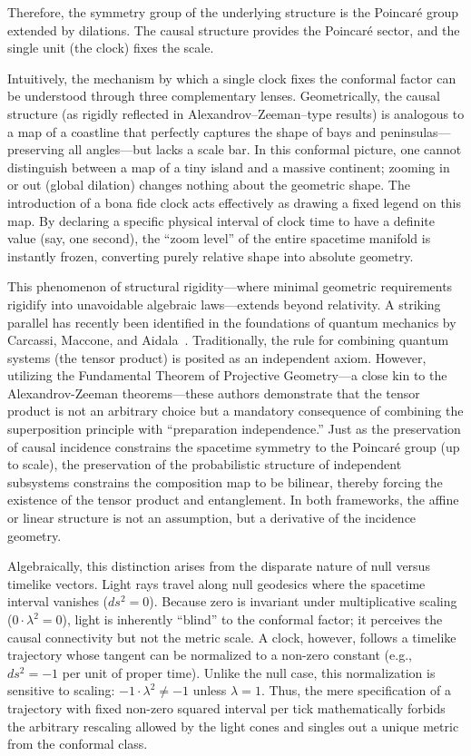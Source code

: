 \documentclass[aps,prd,twocolumn,nofootinbib,superscriptaddress]{revtex4-2}
\begin{document}
Therefore, the symmetry group of the underlying structure is the Poincar{\'e} group extended by dilations. The causal structure provides the Poincar{\'e} sector, and the single unit (the clock) fixes the scale.

Intuitively, the mechanism by which a single clock fixes the conformal factor can be understood through three complementary lenses. Geometrically, the causal structure (as rigidly reflected in Alexandrov--Zeeman--type results) is analogous to a map of a coastline that perfectly captures the shape of bays and peninsulas---preserving all angles---but lacks a scale bar. In this conformal picture, one cannot distinguish between a map of a tiny island and a massive continent; zooming in or out (global dilation) changes nothing about the geometric shape. The introduction of a bona fide clock acts effectively as drawing a fixed legend on this map. By declaring a specific physical interval of clock time to have a definite value (say, one second), the ``zoom level'' of the entire spacetime manifold is instantly frozen, converting purely relative shape into absolute geometry.

This phenomenon of structural rigidity---where minimal geometric requirements rigidify into unavoidable algebraic laws---extends beyond relativity. A striking parallel has recently been identified in the foundations of quantum mechanics by Carcassi, Maccone, and Aidala~\cite{carcassi2021}. Traditionally, the rule for combining quantum systems (the tensor product) is posited as an independent axiom. However, utilizing the Fundamental Theorem of Projective Geometry---a close kin to the Alexandrov-Zeeman theorems---these authors demonstrate that the tensor product is not an arbitrary choice but a mandatory consequence of combining the superposition principle with ``preparation independence.'' Just as the preservation of causal incidence constrains the spacetime symmetry to the Poincar\'{e} group (up to scale), the preservation of the probabilistic structure of independent subsystems constrains the composition map to be bilinear, thereby forcing the existence of the tensor product and entanglement. In both frameworks, the affine or linear structure is not an assumption, but a derivative of the incidence geometry.

Algebraically, this distinction arises from the disparate nature of null versus timelike vectors. Light rays travel along null geodesics where the spacetime interval vanishes ($ds^2 = 0$). Because zero is invariant under multiplicative scaling ($0 \cdot \lambda^2 = 0$), light is inherently ``blind'' to the conformal factor; it perceives the causal connectivity but not the metric scale. A clock, however, follows a timelike trajectory whose tangent can be normalized to a non-zero constant (e.g., $ds^2 = -1$ per unit of proper time). Unlike the null case, this normalization is sensitive to scaling: $-1 \cdot \lambda^2 \neq -1$ unless $\lambda = 1$. Thus, the mere specification of a trajectory with fixed non-zero squared interval per tick mathematically forbids the arbitrary rescaling allowed by the light cones and singles out a unique metric from the conformal class.
\end{document}
